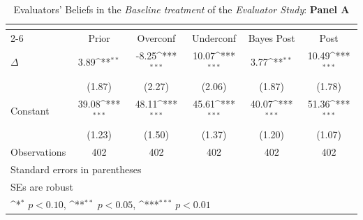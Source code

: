 \begin{table}[htbp]\centering
\def\sym#1{\ifmmode^{#1}\else\(^{#1}\)\fi}
\caption{Evaluators' Beliefs in the \textit{Baseline treatment} of the \textit{Evaluator Study}: \textbf{Panel A}}
\begin{tabular}{l*{5}{c}}
\hline\hline
                &\multicolumn{5}{c}{}                                                                          \\\cmidrule(lr){2-6}
                &\multicolumn{1}{c}{Prior}&\multicolumn{1}{c}{Overconf}&\multicolumn{1}{c}{Underconf}&\multicolumn{1}{c}{Bayes Post}&\multicolumn{1}{c}{Post}\\
\hline
$\Delta$        &     3.89\sym{**} &    -8.25\sym{***}&    10.07\sym{***}&     3.77\sym{**} &    10.49\sym{***}\\
                &   (1.87)         &   (2.27)         &   (2.06)         &   (1.87)         &   (1.78)         \\
Constant        &    39.08\sym{***}&    48.11\sym{***}&    45.61\sym{***}&    40.07\sym{***}&    51.36\sym{***}\\
                &   (1.23)         &   (1.50)         &   (1.37)         &   (1.20)         &   (1.07)         \\
\hline
Observations    &      402         &      402         &      402         &      402         &      402         \\
\hline\hline
\multicolumn{6}{l}{\footnotesize Standard errors in parentheses}\\
\multicolumn{6}{l}{\footnotesize SEs are robust}\\
\multicolumn{6}{l}{\footnotesize \sym{*} \(p<0.10\), \sym{**} \(p<0.05\), \sym{***} \(p<0.01\)}\\
\end{tabular}
\end{table}
